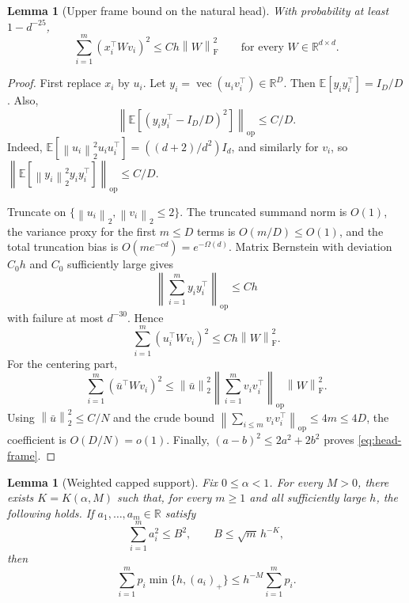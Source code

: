 \documentclass[11pt]{article}
\newtheorem{lemma}[theorem]{Lemma}
\theoremstyle{remark}
\newcommand{\R}{\mathbb R}
\newcommand{\E}{\mathbb E}
\newcommand{\norm}[1]{\left\lVert #1\right\rVert}
\newcommand{\op}{\mathrm{op}}
\newcommand{\F}{\mathrm{F}}
\newcommand{\1}{\mathbf 1}
\newcommand{\vecop}{\operatorname{vec}}
\begin{document}
\begin{lemma}[Upper frame bound on the natural head]
\label{lem:head-frame}
With probability at least $1-d^{-25}$,
\begin{equation}
 \sum_{i=1}^m(x_i^\top Wv_i)^2\leq Ch\norm W_{\F}^2
 \qquad\text{for every }W\in\R^{d\times d}.
 \label{eq:head-frame}
\end{equation}
\end{lemma}

\begin{proof}
First replace $x_i$ by $u_i$.  Let
$y_i=\vecop(u_iv_i^\top)\in\R^D$.  Then
$\E[y_iy_i^\top]=I_D/D$.  Also,
\[
 \left\|\E[(y_iy_i^\top-I_D/D)^2]\right\|_{\op}\leq C/D.
\]
Indeed,
$\E[\norm{u_i}_2^2u_iu_i^\top]=((d+2)/d^2)I_d$, and similarly for
$v_i$, so
$\norm{\E[\norm{y_i}_2^2y_iy_i^\top]}_{\op}\leq C/D$.

Truncate on $\{\norm{u_i}_2,\norm{v_i}_2\leq2\}$.  The truncated
summand norm is $O(1)$, the variance proxy for the first $m\leq D$
terms is $O(m/D)\leq O(1)$, and the total truncation bias is
$O(me^{-cd})=e^{-\Omega(d)}$.  Matrix Bernstein with deviation $C_0h$
and $C_0$ sufficiently large gives
\[
 \left\|\sum_{i=1}^m y_iy_i^\top\right\|_{\op}\leq Ch
\]
with failure at most $d^{-30}$.  Hence
\[
 \sum_{i=1}^m(u_i^\top Wv_i)^2\leq Ch\norm W_{\F}^2.
\]
For the centering part,
\[
 \sum_{i=1}^m(\bar u^\top Wv_i)^2
 \leq\norm{\bar u}_2^2
 \left\|\sum_{i=1}^m v_iv_i^\top\right\|_{\op}
 \norm W_{\F}^2.
\]
Using $\norm{\bar u}_2^2\leq C/N$ and the crude bound
$\norm{\sum_{i\leq m}v_iv_i^\top}_{\op}\leq4m\leq4D$, the coefficient
is $O(D/N)=o(1)$.  Finally,
$(a-b)^2\leq2a^2+2b^2$ proves \eqref{eq:head-frame}.
\end{proof}

\begin{lemma}[Weighted capped support]
\label{lem:capped-support}
Fix $0\leq\alpha<1$.  For every $M>0$, there exists
$K=K(\alpha,M)$ such that, for every $m\geq1$ and all sufficiently
large $h$, the following holds.  If $a_1,\ldots,a_m\in\R$ satisfy
\[
 \sum_{i=1}^m a_i^2\leq B^2,
 \qquad
 B\leq\sqrt m\,h^{-K},
\]
then
\begin{equation}
 \sum_{i=1}^mp_i\min\{h,(a_i)_+\}
 \leq h^{-M}\sum_{i=1}^mp_i.
 \label{eq:capped-support}
\end{equation}
\end{lemma}
\end{document}
